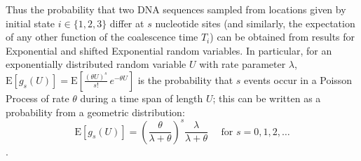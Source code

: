 \documentclass[11pt]{article}
\begin{document}
%
Thus the probability that two DNA sequences 
sampled from locations given by initial state $i \in \{1,2,3\}$ differ at $s$ nucleotide sites
(and similarly, the expectation of any other function of the coalescence time $T_{i}$) 
can be obtained from results for Exponential and shifted Exponential random variables.
In particular, for an exponentially distributed random variable $U$ with rate parameter $\lambda$, $\mathrm{E}[g_{s}(U)] =\mathrm{E}\left[\frac{(\theta U)^{s}}{s!}\,e^{-\theta U}\right]$ is the probability that $s$ events occur in a Poisson Process of rate $\theta$
during a time span of length $U$; this can be written as a probability from a geometric distribution:
\begin{equation}
\label{eq:int_1}
\mathrm{E}[g_{s}(U)]=\left(\frac{\theta}{\lambda+\theta}\right)^{\!s} \frac{\lambda}{\lambda+\theta}~~~~~~\mbox{for } s=0,1,2, \ldots
\end{equation} 
\citep{Watterson1975}.
\end{document}
